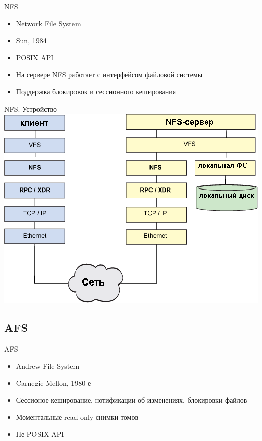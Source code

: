 \documentclass[sans]{beamer}
\begin{document}
\begin{frame}{NFS}
	\begin{itemize}
		\item Network File System
		\item Sun, 1984
		\item POSIX API
		\item На сервере NFS работает с интерфейсом файловой системы
		\item Поддержка блокировок и сессионного кеширования
	\end{itemize}
\end{frame}

\begin{frame}{NFS. Устройство}
	\includegraphics[width = \linewidth]{images/nfsScheme.png}
\end{frame}

\subsection{AFS}

\begin{frame}{AFS}
	\begin{itemize}
		\item Andrew File System
		\item Carnegie Mellon, 1980-е
		\item Сессионое кеширование, нотификации об изменениях, блокировки файлов
		\item Моментальные read-only снимки томов
		\item Не POSIX API
	\end{itemize}
\end{frame}
\end{document}
